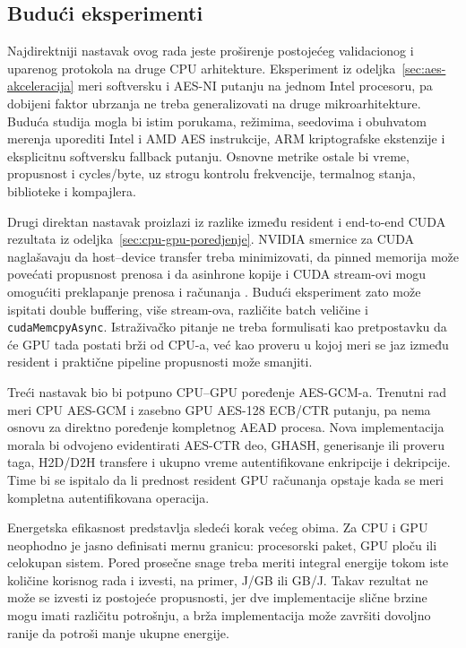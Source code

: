 \subsection{Budući eksperimenti}

Najdirektniji nastavak ovog rada jeste proširenje postojećeg
validacionog i uparenog protokola na druge CPU arhitekture. Eksperiment iz
odeljka~\ref{sec:aes-akceleracija} meri softversku i AES-NI putanju na
jednom Intel procesoru, pa dobijeni faktor ubrzanja ne treba
generalizovati na druge mikroarhitekture. Buduća studija mogla bi istim
porukama, režimima, seedovima i obuhvatom merenja uporediti Intel i AMD
AES instrukcije, ARM kriptografske ekstenzije i eksplicitnu softversku
fallback putanju. Osnovne metrike ostale bi vreme, propusnost i
cycles/byte, uz strogu kontrolu frekvencije, termalnog stanja, biblioteke
i kompajlera.

Drugi direktan nastavak proizlazi iz razlike između resident i end-to-end
CUDA rezultata iz odeljka~\ref{sec:cpu-gpu-poredjenje}. NVIDIA smernice
za CUDA naglašavaju da host--device transfer treba minimizovati, da pinned
memorija može povećati propusnost prenosa i da asinhrone kopije i CUDA
stream-ovi mogu omogućiti preklapanje prenosa i računanja
\cite{NVIDIACUDABestPractices}. Budući eksperiment zato može ispitati
double buffering, više stream-ova, različite batch veličine i
\texttt{cudaMemcpyAsync}. Istraživačko pitanje ne treba formulisati kao
pretpostavku da će GPU tada postati brži od CPU-a, već kao proveru u kojoj
meri se jaz između resident i praktične pipeline propusnosti može smanjiti.

Treći nastavak bio bi potpuno CPU--GPU poređenje AES-GCM-a. Trenutni rad
meri CPU AES-GCM i zasebno GPU AES-128 ECB/CTR putanju, pa nema osnovu za
direktno poređenje kompletnog AEAD procesa. Nova implementacija morala bi
odvojeno evidentirati AES-CTR deo, GHASH, generisanje ili proveru taga,
H2D/D2H transfere i ukupno vreme autentifikovane enkripcije i
dekripcije. Time bi se ispitalo da li prednost resident GPU računanja
opstaje kada se meri kompletna autentifikovana operacija.

Energetska efikasnost predstavlja sledeći korak većeg obima. Za CPU i GPU
neophodno je jasno definisati mernu granicu: procesorski paket, GPU ploču
ili celokupan sistem. Pored prosečne snage treba meriti integral energije
tokom iste količine korisnog rada i izvesti, na primer, J/GB ili GB/J.
Takav rezultat ne može se izvesti iz postojeće propusnosti, jer dve
implementacije slične brzine mogu imati različitu potrošnju, a brža
implementacija može završiti dovoljno ranije da potroši manje ukupne
energije.

